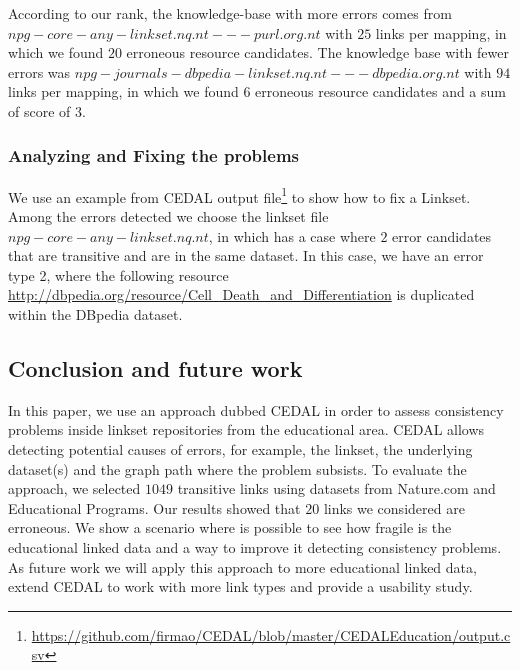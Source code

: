 %
According to our rank, the knowledge-base with more errors comes from $npg-core-any-linkset.nq.nt---purl.org.nt$ with $25$ links per mapping, in which we found $20$ erroneous resource candidates. The knowledge base with fewer errors was $npg-journals-dbpedia-linkset.nq.nt---dbpedia.org.nt$ with $94$ links per mapping, in which we found $6$ erroneous resource candidates and a sum of score of $3$.

\subsubsection{Analyzing and Fixing the problems}
We use an example from CEDAL output file\footnote{\url{https://github.com/firmao/CEDAL/blob/master/CEDALEducation/output.csv}} to show how to fix a Linkset. Among the errors detected we choose the linkset file $npg-core-any-linkset.nq.nt$, in which has a case where $2$ error candidates that are transitive and are in the same dataset. In this case, we have an error type 2, where the following resource \url{http://dbpedia.org/resource/Cell_Death_and_Differentiation} is duplicated within the DBpedia dataset. 



\subsection{Conclusion and future work}
In this paper, we use an approach dubbed CEDAL in order to assess consistency problems inside linkset repositories from the educational area. CEDAL allows detecting potential causes of errors, for example, the linkset, the underlying dataset(s) and the graph path where the problem subsists.
To evaluate the approach, we selected $1049$ transitive links using datasets from Nature.com and Educational Programs. Our results showed that $20$ links we considered are erroneous.
We show a scenario where is possible to see how fragile is the educational linked data and a way to improve it detecting consistency problems.
As future work we will apply this approach to more educational linked data, extend CEDAL to work with more link types and provide a usability study.